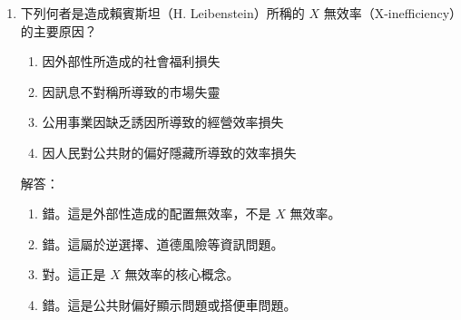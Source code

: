 \documentclass[12pt, a4paper]{article}
\begin{document}
\begin{enumerate}
    例如：
    \begin{itemize}
        \item 成本效益分析：某公共建設成本 1 億元，效益現值 1.5 億元。
        \item 成本有效性分析：某防疫方案成本 1,000 萬元，可減少 500 人感染，計算每減少 1 人感染的成本。
    \end{itemize}

    \item 下列何者是造成賴賓斯坦（H. Leibenstein）所稱的 \(X\) 無效率（X-inefficiency）的主要原因？
    \begin{enumerate}[label=\Alph*.]
        \item 因外部性所造成的社會福利損失
        \item 因訊息不對稱所導致的市場失靈
        \item 公用事業因缺乏誘因所導致的經營效率損失
        \item 因人民對公共財的偏好隱藏所導致的效率損失
    \end{enumerate}
    解答：
    \begin{enumerate}[label=\Alph*.]
        \item 錯。這是外部性造成的配置無效率，不是 \(X\) 無效率。
        \item 錯。這屬於逆選擇、道德風險等資訊問題。
        \item 對。這正是 \(X\) 無效率的核心概念。
        \item 錯。這是公共財偏好顯示問題或搭便車問題。
    \end{enumerate}


\end{enumerate}
\end{document}
